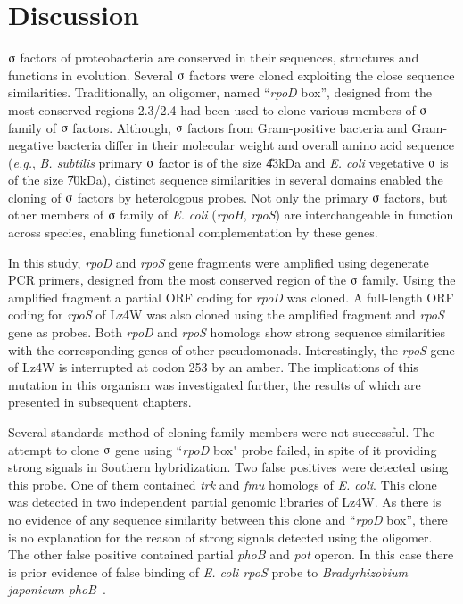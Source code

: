 \section{Discussion}

$\sigmaup$ factors of proteobacteria are conserved in their
sequences, structures and functions in evolution. Several
$\sigmaup$ factors were cloned exploiting the close sequence
similarities. Traditionally, an oligomer, named ``\emph{rpoD}
box'', designed from the most conserved regions 2.3/2.4 had been
used to clone various members of $\sigmaup$ family of
$\sigmaup$ factors. Although, $\sigmaup$ factors from
Gram-positive bacteria and Gram-negative bacteria differ in their
molecular weight and overall amino acid sequence (\emph{e.g.},
\emph{B. subtilis} primary $\sigmaup$ factor is of the size
\U{43}{kDa} and \emph{E. coli} vegetative $\sigmaup$ is of the
size \U{70}{kDa}), distinct sequence similarities in several
domains enabled the cloning of $\sigmaup$ factors by heterologous
probes. Not only the primary $\sigmaup$ factors, but other members
of $\sigmaup$ family of \emph{E. coli} (\emph{rpoH},
\emph{rpoS}) are interchangeable in function across species,
enabling functional complementation by these genes.

In this study, \emph{rpoD} and \emph{rpoS} gene fragments were
amplified using degenerate PCR primers, designed from the most
conserved region of the $\sigmaup$ family. Using the
amplified fragment a partial ORF coding for \emph{rpoD} was
cloned. A full-length ORF coding for \emph{rpoS} of Lz4W was also
cloned using the amplified fragment and  \emph{rpoS} gene
as probes. Both \emph{rpoD} and \emph{rpoS} homologs show strong
sequence similarities with the corresponding genes of other
pseudomonads. Interestingly, the \emph{rpoS} gene of Lz4W is
interrupted at codon 253 by an amber. The implications of this
mutation in this organism was investigated further, the results of
which are presented in subsequent chapters.

Several standards method of cloning \siga{} family members were
not successful. The attempt to clone $\sigmaup$ gene using
``\emph{rpoD} box" probe failed, in spite of it providing strong
signals in Southern hybridization. Two false positives were
detected using this probe. One of them contained \emph{trk} and
\emph{fmu} homologs of \emph{E. coli}. This clone was detected in
two independent partial genomic libraries of Lz4W. As there is no
evidence of any sequence similarity between this clone and
``\emph{rpoD} box'', there is no explanation for the reason of
strong signals detected using the oligomer. The other false
positive contained partial \emph{phoB} and \emph{pot} operon. In
this case there is prior evidence of false binding of \emph{E.
coli rpoS} probe to \emph{Bradyrhizobium japonicum
phoB}~\citep{Minder1998}.

